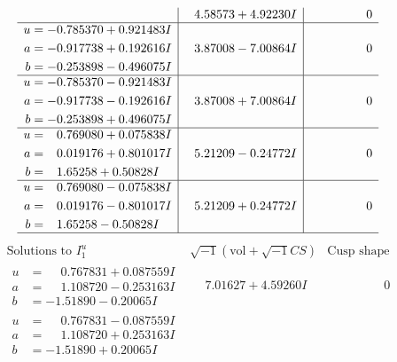\documentclass[1p]{elsarticle_modified}
\theoremstyle{definition}
\newcommand{\I}{\sqrt{-1}}
\begin{document}
$$\begin{array}{c|c|c}
 & \phantom{-}4.58573 + 4.92230 I & \phantom{-0.000000 } 0 \\ \hline\begin{aligned}
u &= -0.785370 + 0.921483 I \\
a &= -0.917738 + 0.192616 I \\
b &= -0.253898 - 0.496075 I\end{aligned}
 & \phantom{-}3.87008 - 7.00864 I & \phantom{-0.000000 } 0 \\ \hline\begin{aligned}
u &= -0.785370 - 0.921483 I \\
a &= -0.917738 - 0.192616 I \\
b &= -0.253898 + 0.496075 I\end{aligned}
 & \phantom{-}3.87008 + 7.00864 I & \phantom{-0.000000 } 0 \\ \hline\begin{aligned}
u &= \phantom{-}0.769080 + 0.075838 I \\
a &= \phantom{-}0.019176 + 0.801017 I \\
b &= \phantom{-}1.65258 + 0.50828 I\end{aligned}
 & \phantom{-}5.21209 - 0.24772 I & \phantom{-0.000000 } 0 \\ \hline\begin{aligned}
u &= \phantom{-}0.769080 - 0.075838 I \\
a &= \phantom{-}0.019176 - 0.801017 I \\
b &= \phantom{-}1.65258 - 0.50828 I\end{aligned}
 & \phantom{-}5.21209 + 0.24772 I & \phantom{-0.000000 } 0\\
 \hline 
 \end{array}$$\newpage$$\begin{array}{c|c|c}  
\text{Solutions to }I^u_{1}& \I (\text{vol} + \sqrt{-1}CS) & \text{Cusp shape}\\
 \hline 
\begin{aligned}
u &= \phantom{-}0.767831 + 0.087559 I \\
a &= \phantom{-}1.108720 - 0.253163 I \\
b &= -1.51890 - 0.20065 I\end{aligned}
 & \phantom{-}7.01627 + 4.59260 I & \phantom{-0.000000 } 0 \\ \hline\begin{aligned}
u &= \phantom{-}0.767831 - 0.087559 I \\
a &= \phantom{-}1.108720 + 0.253163 I \\
b &= -1.51890 + 0.20065 I\end{aligned}

\end{array}$$
\end{document}
